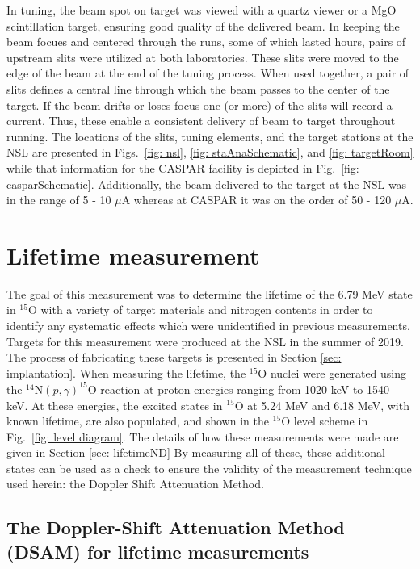In tuning, the beam spot on target was viewed with a quartz viewer or a MgO scintillation target, ensuring good quality of the delivered beam. In keeping the beam focues and centered through the runs, some of which lasted hours, pairs of upstream slits were utilized at both laboratories. These slits were moved to the edge of the beam at the end of the tuning process. When used together, a pair of slits defines a central line through which the beam passes to the center of the target. If the beam drifts or loses focus one (or more) of the slits will record a current. Thus, these enable a consistent delivery of beam to target throughout running. The locations of the slits, tuning elements, and the target stations at the NSL are presented in Figs.\ \ref{fig: nsl}, \ref{fig: staAnaSchematic}, and \ref{fig: targetRoom} while that information for the CASPAR facility is depicted in Fig.\ \ref{fig: casparSchematic}. Additionally, the beam delivered to the target at the NSL was in the range of 5 - 10 $\mu$A whereas at CASPAR it was on the order of 50 - 120 $\mu$A.



\section{Lifetime measurement}
\label{sec: lifetime experiment}

The goal of this measurement was to determine the lifetime of the 6.79 MeV state in $^{15}$O with a variety of target materials and nitrogen contents in order to identify any systematic effects which were unidentified in previous measurements. Targets for this measurement were produced at the NSL in the summer of 2019. The process of fabricating these targets is presented in Section \ref{sec: implantation}. When measuring the lifetime, the $^{15}$O nuclei were generated using the  $^{14}$N$\left( p,\gamma \right) ^{15}$O reaction at proton energies ranging from 1020 keV to 1540 keV. At these energies, the excited states in $^{15}$O at 5.24 MeV and 6.18 MeV, with known lifetime, are also populated, and shown in the $^{15}$O level scheme in Fig.\ \ref{fig: level diagram}. The details of how these measurements were made are given in Section \ref{sec: lifetimeND} By measuring all of these, these additional states can be used as a check to ensure the validity of the measurement technique used herein: the Doppler Shift Attenuation Method. 


\subsection{The Doppler-Shift Attenuation Method (DSAM) for lifetime measurements}
\label{sec: DSAM}


